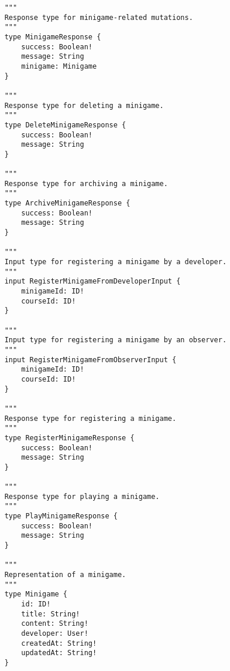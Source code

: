 \begin{verbatim}
	"""
	Response type for minigame-related mutations.
	"""
	type MinigameResponse {
		success: Boolean!
		message: String
		minigame: Minigame
	}
	
	"""
	Response type for deleting a minigame.
	"""
	type DeleteMinigameResponse {
		success: Boolean!
		message: String
	}
	
	"""
	Response type for archiving a minigame.
	"""
	type ArchiveMinigameResponse {
		success: Boolean!
		message: String
	}
	
	"""
	Input type for registering a minigame by a developer.
	"""
	input RegisterMinigameFromDeveloperInput {
		minigameId: ID!
		courseId: ID!
	}
	
	"""
	Input type for registering a minigame by an observer.
	"""
	input RegisterMinigameFromObserverInput {
		minigameId: ID!
		courseId: ID!
	}
	
	"""
	Response type for registering a minigame.
	"""
	type RegisterMinigameResponse {
		success: Boolean!
		message: String
	}
	
	"""
	Response type for playing a minigame.
	"""
	type PlayMinigameResponse {
		success: Boolean!
		message: String
	}
	
	"""
	Representation of a minigame.
	"""
	type Minigame {
		id: ID!
		title: String!
		content: String!
		developer: User!
		createdAt: String!
		updatedAt: String!
	}
\end{verbatim}

